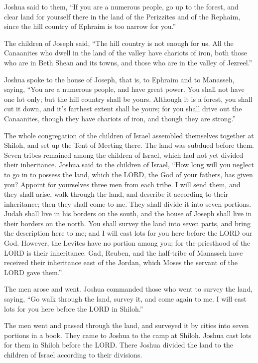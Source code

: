 \myverse{}Joshua said to them, “If you are a numerous people, go up to
the forest, and clear land for yourself there in the land of the Perizzites and of the Rephaim, since
the hill country of Ephraim is too narrow for you.”

\myverse{}The children of Joseph said, “The hill country is not enough
for us. All the Canaanites who dwell in the land of the valley have chariots of iron, both those who are
in Beth Shean and its towns, and those who are in the valley of Jezreel.”

\myverse{}Joshua spoke to the house of Joseph, that is, to Ephraim and
to Manasseh, saying, “You are a numerous people, and have great power. You shall not have one lot only;
\myverse{}but the hill country shall be yours. Although it is a forest, you shall cut
it down, and it’s farthest extent shall be yours; for you shall drive out the Canaanites, though they
have chariots of iron, and though they are strong.”


\mychapter{} \myverse*{}The whole congregation of the children of Israel assembled themselves
together at Shiloh, and set up the Tent of Meeting there. The land was subdued before them.
\myverse{}Seven tribes remained among the children of Israel, which had not yet divided
their inheritance.
\myverse{}Joshua said to the children of Israel, “How long will you neglect to go in
to possess the land, which the LORD, the God of your fathers, has given you?
\myverse{}Appoint for yourselves three men from each tribe. I will send them, and they
shall arise, walk through the land, and describe it according to their inheritance; then they shall come
to me.
\myverse{}They shall divide it into seven portions. Judah shall live in his borders on
the south, and the house of Joseph shall live in their borders on the north.
\myverse{}You shall survey the land into seven parts, and bring the description here
to me; and I will cast lots for you here before the LORD our God.
\myverse{}However, the Levites have no portion among you; for the priesthood of the LORD
is their inheritance. Gad, Reuben, and the half-tribe of Manasseh have received their inheritance east
of the Jordan, which Moses the servant of the LORD gave them.”

\myverse{}The men arose and went. Joshua commanded those who went to survey
the land, saying, “Go walk through the land, survey it, and come again to me. I will cast lots for you
here before the LORD in Shiloh.”

\myverse{}The men went and passed through the land, and surveyed it by cities
into seven portions in a book. They came to Joshua to the camp at Shiloh.
\myverse{}Joshua cast lots for them in Shiloh before the LORD. There Joshua divided
the land to the children of Israel according to their divisions.

